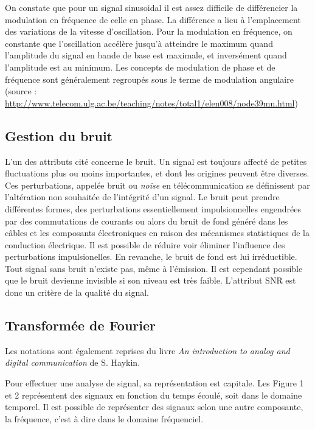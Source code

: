 On constate que pour un signal sinusoidal il est assez difficile de différencier la modulation en fréquence de celle en phase. La différence a lieu à l'emplacement des variations de la vitesse d'oscillation. Pour la modulation en fréquence, on constante que l'oscillation accélère jusqu'à atteindre le maximum quand l'amplitude du signal en bande de base est maximale, et inversément quand l'amplitude est au minimum. Les concepts de modulation de phase et de fréquence sont généralement regroupés sous le terme de modulation angulaire (source : \href{http://www.telecom.ulg.ac.be/teaching/notes/total1/elen008/node39_mn.html}{http://www.telecom.ulg.ac.be/teaching/notes/total1/elen008/node39mn.html})


\subsection{Gestion du bruit}

L'un des attributs cité concerne le bruit. Un signal est toujours affecté de petites fluctuations plus ou moins importantes, et dont les origines peuvent être diverses. Ces perturbations, appelée bruit ou \textit{noise} en télécommunication se définissent par l'altération non souhaitée de l'intégrité d'un signal. Le bruit peut prendre différentes formes, des perturbations essentiellement impulsionnelles engendrées par des commutations de courants ou alors du bruit de fond généré dans les câbles et les composants électroniques en raison
des mécanismes statistiques de la conduction électrique. Il est possible de réduire voir éliminer l'influence des perturbations impulsionelles. En revanche, le bruit de fond est lui irréductible. Tout signal sans bruit n'existe pas, même à l'émission. Il est cependant possible que le bruit devienne invisible si son niveau est très faible. L'attribut SNR est donc un critère de la qualité du signal.


\subsection{Transformée de Fourier}

Les notations sont également reprises du livre \textit{An introduction to analog and digital communication} de S. Haykin\cite{book1}.

\vspace{0.1cm}

Pour effectuer une analyse de signal, sa représentation est capitale. Les Figure 1 et 2 représentent des signaux en fonction du temps écoulé, soit dans le domaine temporel. Il est possible de représenter des signaux selon une autre composante, la fréquence, c'est à dire dans le domaine fréquenciel.

